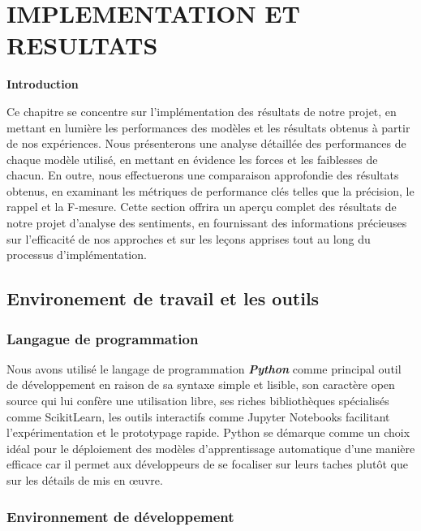 \clearpage
\chapter{IMPLEMENTATION ET RESULTATS}

\textbf{Introduction}\par
Ce chapitre se concentre sur l'implémentation des résultats de notre projet, en mettant en lumière les performances des modèles et les résultats obtenus à partir de nos expériences. Nous présenterons une analyse détaillée des performances de chaque modèle utilisé, en mettant en évidence les forces et les faiblesses de chacun. En outre, nous effectuerons une comparaison approfondie des résultats obtenus, en examinant les métriques de performance clés telles que la précision, le rappel et la F-mesure. Cette section offrira un aperçu complet des résultats de notre projet d'analyse des sentiments, en fournissant des informations précieuses sur l'efficacité de nos approches et sur les leçons apprises tout au long du processus d'implémentation.

\section{Environement de travail et les outils }
\subsection{Langague de programmation}
Nous avons utilisé le langage de programmation\textbf{\textit{ Python}} comme principal outil de développement en raison de sa syntaxe simple et lisible, son caractère open source qui lui confère une utilisation libre, ses riches bibliothèques spécialisés comme ScikitLearn, les outils interactifs comme Jupyter Notebooks facilitant l’expérimentation et le prototypage rapide.
Python se démarque comme un choix idéal pour le déploiement des modèles d’apprentissage automatique d’une manière efficace car il permet aux développeurs de se focaliser sur leurs taches plutôt que sur les détails de mis en œuvre.      

\subsection{Environnement de développement}

